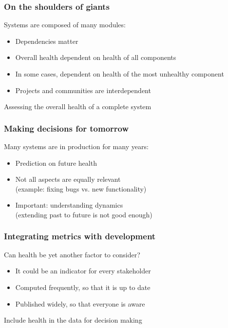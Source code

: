\documentclass[17pt,aspectratio=169,hyperref=pdfusetitle]{beamer}
\begin{document}
\begin{frame}[fragile]
  \frametitle{On the shoulders of giants}

  Systems are composed of many modules:

  \begin{itemize}
  \item Dependencies matter
  \item Overall health dependent on health of all components
  \item In some cases, dependent on health of the most unhealthy component
  \item Projects and communities are interdependent
  \end{itemize}

  Assessing the overall health of a complete system
  
\end{frame}

\begin{frame}[fragile]
  \frametitle{Making decisions for tomorrow}

  Many systems are in production for many years:

  \begin{itemize}
  \item Prediction on future health
  \item Not all aspects are equally relevant \\
    (example: fixing bugs vs. new functionality)
  \item Important: understanding dynamics \\
    (extending past to future is not good enough)
  \end{itemize}
\end{frame}

\begin{frame}[fragile]
  \frametitle{Integrating metrics with development}

  Can health be yet another factor to consider?

  \begin{itemize}
  \item It could be an indicator for every stakeholder
  \item Computed frequently, so that it is up to date
  \item Published widely, so that everyone is aware
  \end{itemize}

  Include health in the data for decision making

\end{frame}
\end{document}
